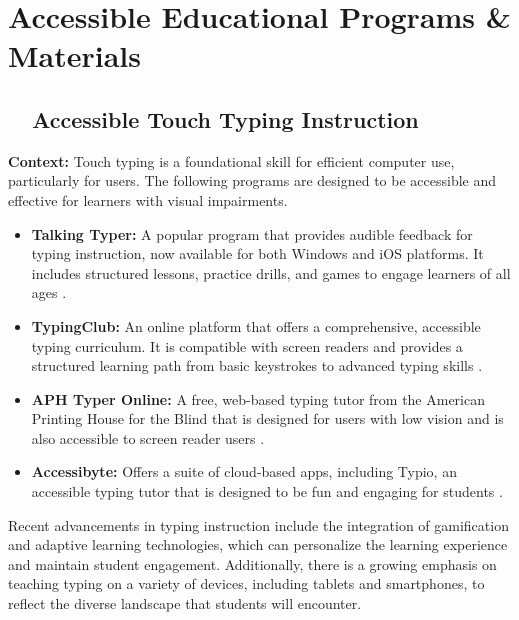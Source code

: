 \chapter{Accessible Educational Programs \& Materials}\label{app4:instructional-programs}

\section{~~Accessible Touch Typing Instruction}\label{app4:typing-instruction}

\noindent
\textbf{Context:} Touch typing is a foundational skill for efficient computer use, particularly for  users. The following programs are designed to be accessible and effective for learners with visual impairments.

\begin{itemize}
	\item \textbf{Talking Typer:} A popular  program that provides audible feedback for typing instruction, now available for both Windows and iOS platforms. It includes structured lessons, practice drills, and games to engage learners of all ages \cite{TypeAbility2025}.
	\item \textbf{TypingClub:} An online platform that offers a comprehensive, accessible typing curriculum. It is compatible with screen readers and provides a structured learning path from basic keystrokes to advanced typing skills \cite{TypingClub2025}.
	\item \textbf{APH Typer Online:} A free, web-based typing tutor from the American Printing House for the Blind that is designed for users with low vision and is also accessible to screen reader users \cite{APH2025}.
	\item \textbf{Accessibyte:} Offers a suite of cloud-based apps, including Typio, an accessible typing tutor that is designed to be fun and engaging for students \cite{Typio2025}.
\end{itemize}

Recent advancements in typing instruction include the integration of gamification and adaptive learning technologies, which can personalize the learning experience and maintain student engagement. Additionally, there is a growing emphasis on teaching typing on a variety of devices, including tablets and smartphones, to reflect the diverse  landscape that students will encounter.

